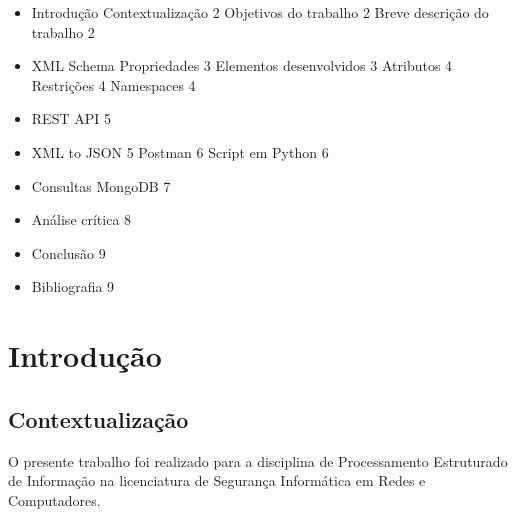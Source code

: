 \documentclass{article}
\begin{document}
\begin{itemize}
    \item Introdução
        \subitem Contextualização \hspace*{\fill} 2
        \subitem Objetivos do trabalho \hspace*{\fill} 2
        \subitem Breve descrição do trabalho \hspace*{\fill} 2
    \item XML Schema
        \subitem Propriedades   \hspace*{\fill} 3
            \subsubitem Elementos desenvolvidos   \hspace*{\fill} 3
            \subsubitem Atributos   \hspace*{\fill} 4
            \subsubitem Restrições   \hspace*{\fill} 4
            \subsubitem Namespaces   \hspace*{\fill} 4
    \item REST API \hspace*{\fill} 5
    \item XML to JSON \hspace*{\fill} 5
        \subitem Postman   \hspace*{\fill} 6
        \subitem Script em Python   \hspace*{\fill} 6
    \item Consultas MongoDB \hspace*{\fill} 7  
    \item Análise crítica \hspace*{\fill} 8
    \item Conclusão \hspace*{\fill} 9
    \item Bibliografia\hspace*{\fill} 9
\end{itemize} 

\newpage
\section{Introdução}
\subsection{Contextualização}
\hspace{0.5cm}O presente trabalho foi realizado para a disciplina de Processamento Estruturado de Informação na licenciatura de Segurança Informática em Redes e Computadores. \par
\end{document}
